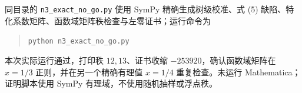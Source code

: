 \documentclass[UTF8,11pt]{ctexart}
\begin{document}
同目录的 \texttt{n3\_exact\_no\_go.py} 使用 SymPy 精确生成树级校准、式 (5) 缺陷、特化系数矩阵、函数域矩阵秩检查与左零证书；运行命令为
\begin{quote}\texttt{python n3\_exact\_no\_go.py}\end{quote}
本次实际运行通过，打印秩 $12,13$、证书收缩 $-253920$，确认函数域矩阵在 $x=1/3$ 正则，并在另一个精确有理值 $x=1/4$ 重复检查。未运行 Mathematica；证明脚本使用 SymPy 有理域，不使用随机抽样或浮点秩。
\end{document}
